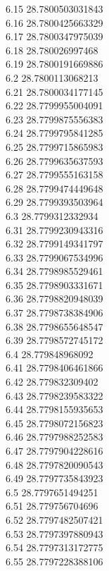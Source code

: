 {6.15	28.7800503031843\\
6.16	28.7800425663329\\
6.17	28.7800347975039\\
6.18	28.780026997468\\
6.19	28.7800191669886\\
6.2	28.7800113068213\\
6.21	28.7800034177145\\
6.22	28.7799955004091\\
6.23	28.7799875556383\\
6.24	28.7799795841285\\
6.25	28.7799715865983\\
6.26	28.7799635637593\\
6.27	28.7799555163158\\
6.28	28.7799474449648\\
6.29	28.7799393503964\\
6.3	28.7799312332934\\
6.31	28.7799230943316\\
6.32	28.7799149341797\\
6.33	28.7799067534996\\
6.34	28.7798985529461\\
6.35	28.7798903331671\\
6.36	28.7798820948039\\
6.37	28.7798738384906\\
6.38	28.7798655648547\\
6.39	28.7798572745172\\
6.4	28.779848968092\\
6.41	28.7798406461866\\
6.42	28.779832309402\\
6.43	28.7798239583322\\
6.44	28.7798155935653\\
6.45	28.7798072156823\\
6.46	28.7797988252583\\
6.47	28.7797904228616\\
6.48	28.7797820090543\\
6.49	28.7797735843923\\
6.5	28.7797651494251\\
6.51	28.779756704696\\
6.52	28.7797482507421\\
6.53	28.7797397880943\\
6.54	28.7797313172775\\
6.55	28.7797228388106\\
}
